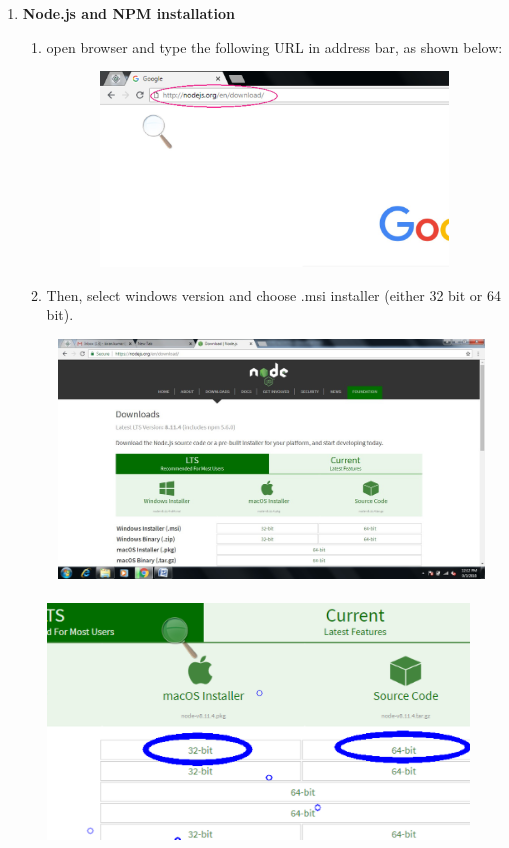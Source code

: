 \documentclass{article}
\begin{document}
\begin{enumerate}
	\item \textbf{Node.js and NPM installation }
	\begin{enumerate}
		\item  open browser and type the following URL in address bar, as shown below:
		\begin{center}
			\noindent \includegraphics*[width=4.83in, height=2.04in]{IMG-01-01}
		\end{center}
			\item Then, select windows version and choose .msi installer (either 32 bit or 64 bit).
			 \begin{center}
			 	\includegraphics*[width=4.69in, height=2.50in]{IMG-01-02}
			 	 \includegraphics*[width=4.41in, height=2.88in]{IMG-01-03}  

\end{center}
\end{enumerate}
\end{enumerate}
\end{document}
